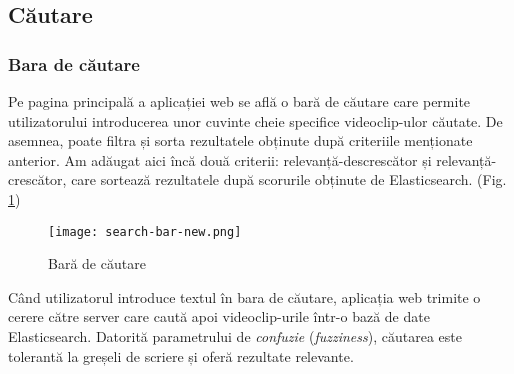 \subsection{Căutare}
\subsubsection{Bara de căutare}
Pe pagina principală a aplicației web se află o bară de căutare care permite utilizatorului
introducerea unor cuvinte cheie specifice videoclip-ulor căutate. De asemnea, poate filtra
și sorta rezultatele obținute după criteriile menționate anterior. Am adăugat aici încă două
criterii: relevanță-descrescător și relevanță-crescător, care sortează rezultatele după
scorurile obținute de Elasticsearch.
(Fig. \ref{fig:search-bar})

\begin{figure}[h]
    \centering
    \texttt{[image: search-bar-new.png]}
    \caption{Bară de căutare}
    \label{fig:search-bar}
\end{figure}

\par
Când utilizatorul introduce textul în bara de căutare, aplicația web trimite o cerere 
către server care caută apoi videoclip-urile într-o bază de date Elasticsearch. Datorită
parametrului de \textit{confuzie} (\textit{fuzziness}), căutarea este tolerantă la greșeli
de scriere și oferă rezultate relevante.

